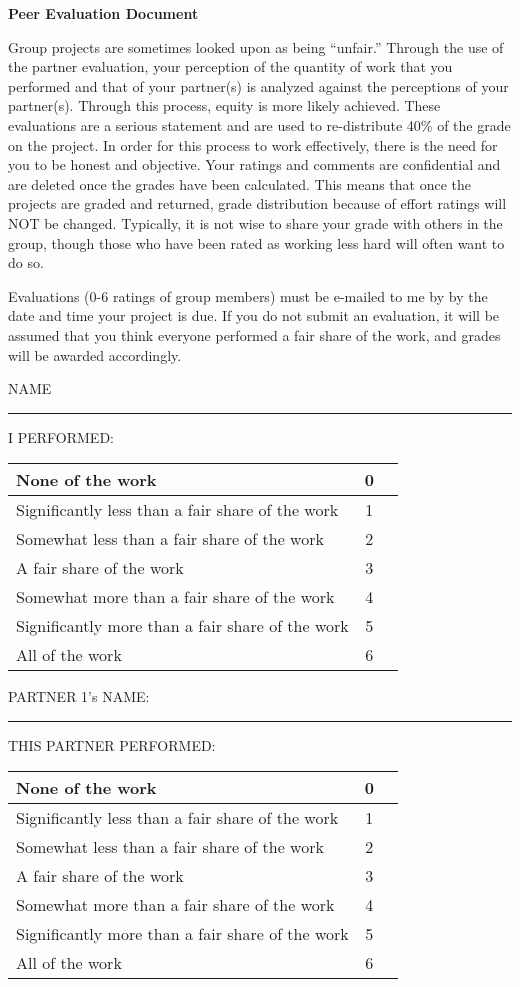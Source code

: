 \documentclass[11pt]{article}
\newcommand{\bo}[1]{\textbf{#1}}
\begin{document}
\thispagestyle{empty}
\centerline{\large\bo{Peer Evaluation Document}}

Group projects are sometimes looked upon as being ``unfair.''  Through the use of the partner evaluation, your perception of the quantity of work that you performed and that of your partner(s) is analyzed against the perceptions of your partner(s). Through this process, equity is more likely achieved. These evaluations are a serious statement and are used to re-distribute 40\% of the grade on the project. In order for this process to work effectively, there is the need for you to be honest and objective. Your ratings and comments are confidential and are deleted once the grades have been calculated.  This means that once the projects are graded and returned, grade distribution because of effort ratings will NOT be changed.  Typically, it is not wise to share your grade with others in the group, though those who have been rated as working less hard will often want to do so.

Evaluations (0-6 ratings of group members) must be e-mailed to me by by the date and time your project is due.  If you do not submit an evaluation, it will be assumed that you think everyone performed a fair share of the work, and grades will be awarded accordingly.

\setlength{\parskip}{3ex}
NAME \rule[-1pt]{4in}{.5pt}

I PERFORMED:

\setlength{\extrarowheight}{3pt}
\begin{tabular}{|l|c|p{.5in}|}
\hline
None of the work&0&\\
\hline
Significantly less than a fair share of the work&1&\\
\hline
Somewhat less than a fair share of the work&2&\\
\hline
A fair share of the work&3&\\
\hline
Somewhat more than a fair share of the work&4&\\
\hline
Significantly more than a fair share of the work&5&\\
\hline
All of the work&6&\\
\hline
\end{tabular}

PARTNER 1's NAME: \rule[-1pt]{4in}{.5pt}

THIS PARTNER PERFORMED:

\begin{tabular}{|l|c|p{.5in}|}
\hline
None of the work&0&\\
\hline
Significantly less than a fair share of the work&1&\\
\hline
Somewhat less than a fair share of the work&2&\\
\hline
A fair share of the work&3&\\
\hline
Somewhat more than a fair share of the work&4&\\
\hline
Significantly more than a fair share of the work&5&\\
\hline
All of the work&6&\\
\hline
\end{tabular}
\end{document}
